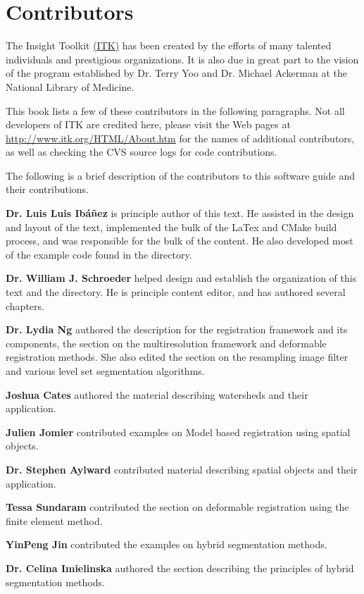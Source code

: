 \chapter*{Contributors}
\noindent

The Insight Toolkit \href{http://www.itk.org}{(ITK)} has been created by the
efforts of many talented individuals and prestigious organizations. It is also
due in great part to the vision of the program established by Dr. Terry Yoo
and Dr. Michael Ackerman at the National Library of Medicine.

This book lists a few of these contributors in the following paragraphs. Not
all developers of ITK are credited here, please visit the Web pages at
\href{http://www.itk.org/HTML/About.htm}{http://www.itk.org/HTML/About.htm} 
for the names of additional contributors, as well as checking the CVS source
logs for code contributions.

The following is a brief description of the contributors to this software
guide and their contributions.

{\bf Dr. Luis Luis Ib\'{a}\~{n}ez} is principle author of this text.
He assisted in the design and layout of the text, implemented the bulk of
the LaTex and CMake build process, and was responsible for the bulk of 
the content. He also developed most of the example code found in the
 directory.

{\bf Dr. William J. Schroeder} helped design and establish the organization 
of this text and the  directory. He is principle 
content editor, and has authored several chapters.

{\bf Dr. Lydia Ng} authored the description for the registration framework and
its components, the section on the multiresolution framework and deformable
registration methods. She also edited the section on the resampling image
filter and various level set segmentation algorithms.

{\bf Joshua Cates} authored the material describing watersheds and their
application.

{\bf Julien Jomier} contributed examples on Model based registration using
spatial objects.

{\bf Dr. Stephen Aylward}  contributed material describing spatial objects and
their application.

{\bf Tessa Sundaram} contributed the section on deformable registration using
the finite element method.

{\bf YinPeng Jin} contributed the examples on  hybrid segmentation methods. 

{\bf Dr. Celina Imielinska} authored the section describing the principles of
hybrid segmentation methods.
